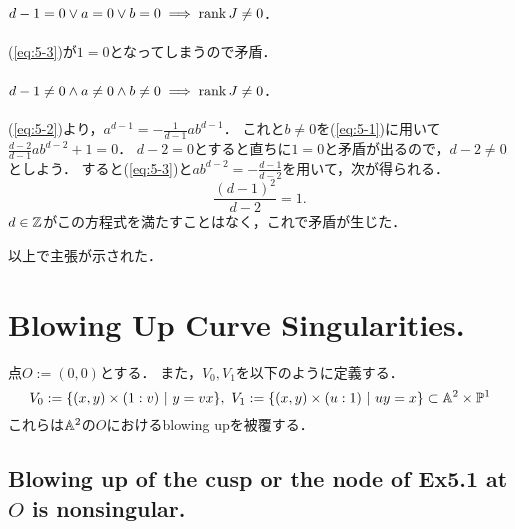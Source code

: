 \documentclass[a4paper]{jsarticle}
\begin{document}
    \paragraph{$d-1=0 \lor a=0 \lor b=0 \implies \operatorname{rank} J \neq 0$.}
    (\ref{eq:5-3})が$1=0$となってしまうので矛盾．

    \paragraph{$d-1 \neq 0 \land a \neq 0 \land b \neq 0 \implies \operatorname{rank} J \neq 0$.}
    (\ref{eq:5-2})より，$a^{d-1}=-\frac{1}{d-1} ab^{d-1}$．
    これと$b \neq 0$を(\ref{eq:5-1})に用いて$\frac{d-2}{d-1} ab^{d-2}+1=0$．
    $d-2=0$とすると直ちに$1=0$と矛盾が出るので，$d-2 \neq 0$としよう．
    すると(\ref{eq:5-3})と$ab^{d-2}=-\frac{d-1}{d-2}$を用いて，次が得られる．
    \[ \frac{(d-1)^2}{d-2}=1. \]
    $d \in \mathbb{Z}$がこの方程式を満たすことはなく，これで矛盾が生じた．

    以上で主張が示された．

\section{Blowing Up Curve Singularities.} %
    点$O:=(0,0)$とする．
    また，$V_0, V_1$を以下のように定義する．
    \[ V_0:=\{(x,y) \times (1:v) ~|~ y=vx \},~ V_1:=\{(x,y) \times (u:1) ~|~ uy=x \} \subset \mathbb{A}^2 \times \mathbb{P}^1 \]
    これらは$\mathbb{A}^2$の$O$におけるblowing upを被覆する．

    \subsection{Blowing up of the cusp or the node of Ex5.1 at $O$ is nonsingular.}
\end{document}
